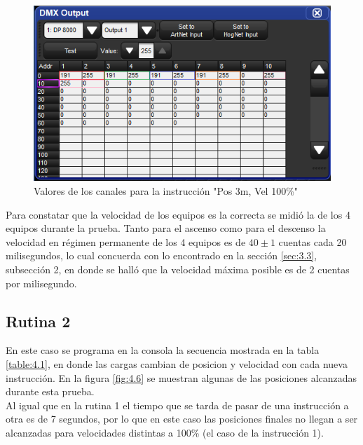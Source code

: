 \begin{figure}[!ht]
	\centering
	\includegraphics[width=16cm,scale=1]{resources/4_5-cuelist1_cue2.png}
	\caption{Valores de los canales para la instrucción "Pos 3m, Vel 100\%"}
	\label{fig:\thefigure}
\end{figure}

Para constatar que la velocidad de los equipos es la correcta se midió la de los 4 equipos durante la prueba. Tanto para el ascenso como para el descenso la velocidad en régimen permanente de los 4 equipos es de \(40 \pm 1\) cuentas cada 20 milisegundos, lo cual concuerda con lo encontrado en la sección \ref{sec:3.3}, subsección 2, en donde se halló que la velocidad máxima posible es de 2 cuentas por milisegundo.

\subsection{Rutina 2}
En este caso se programa en la consola la secuencia mostrada en la tabla \ref{table:4.1}, en donde las cargas cambian de posicion y velocidad con cada nueva instrucción. En la figura \ref{fig:4.6} se muestran algunas de las posiciones alcanzadas durante esta prueba. \\
Al igual que en la rutina 1 el tiempo que se tarda de pasar de una instrucción a otra es de 7 segundos, por lo que en este caso las posiciones finales no llegan a ser alcanzadas para velocidades distintas a 100\% (el caso de la instrucción 1).

